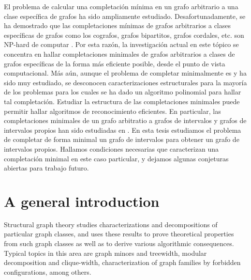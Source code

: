 \documentclass[12pt]{book}
\theoremstyle{plain}
\theoremstyle{remark}
\begin{document}
El problema de calcular una completación mínima en un grafo arbitrario a una clase específica de grafos ha sido ampliamente estudiado. Desafortunadamente, se ha de\-mos\-tra\-do que las completaciones mínimas de grafos arbitrarios a clases específicas de grafos como los cografos, grafos bipartitos, grafos cordales, etc. son NP-hard de computar \cite{NSS01,BBD06,Y81}. 
Por esta razón, la investigación actual en este tópico se concentra en hallar com\-ple\-ta\-cio\-nes minimales de grafos arbitrarios a clases de grafos específicas de la forma más eficiente posible, desde el punto de vista computacional. Más aún, aunque el pro\-ble\-ma de completar minimalmente es y ha sido muy estudiado, se desconocen caracterizaciones estructurales para la mayoría de los problemas para los cuales se ha dado un algoritmo polinomial para hallar tal completación. Estudiar la estructura de las completaciones minimales puede permitir hallar algoritmos de reconocimiento eficientes. 
En particular, las completaciones minimales de un grafo arbitratio a grafos de intervalos y grafos de intervalos propios han sido estudiadas en \cite{CT13,RST06}.
En esta tesis estudiamos el problema de completar de forma minimal un grafo de intervalos para obtener un grafo de intervalos propios. Hallamos condiciones necesarias que caracterizan una completación minimal en este caso particular, y dejamos algunas conjeturas abiertas para trabajo futuro.





%
\chapter*{A general introduction}

Structural graph theory studies characterizations and decompositions of particular graph classes, and uses these results to prove theoretical properties from such graph classes as well as to derive various algorithmic consequences.
Typical topics in this area are graph minors and treewidth, modular decomposition and clique-width, characterization of graph families by forbidden configurations, among others. 
\end{document}
